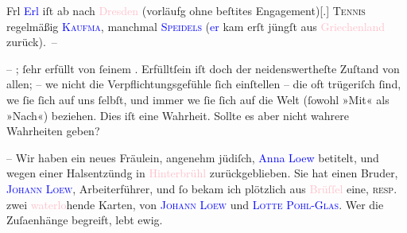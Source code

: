 \pstart
           Frl \textcolor{blue}{Erl}{}\ledrightnote{\textcolor{blue}{Dora Erl}} iſt ab nach \textcolor{pink}{Dresden}{}\ledrightnote{\textcolor{pink}{Dresden}} (vorläufg ohne beſti{\geminationm}tes
                  Engagement){[}.{]}{ }\textsc{Tennis} regelmäßig \textsc{\textcolor{blue}{Kaufma{\geminationn}}{}\ledrightnote{\textcolor{blue}{Arthur Kaufmann}}}, manchmal \textsc{\textcolor{blue}{Speidels}{}\ledrightnote{\textcolor{blue}{Felix Speidel}{\newline}\textcolor{blue}{Else Speidel-Haeberle}}} (\textcolor{blue}{er}{}\ledrightnote{{$\rightarrow$}\textcolor{blue}{Felix Speidel}} kam erſt jüngſt aus
                  \textcolor{pink}{Griechenland}{}\ledrightnote{\textcolor{pink}{Griechenland}} zurück). –\pend
           
\pstart
           – \label{K_L03005-15v}\label{K_L03005-15h}; ſehr erfüllt von ſeinem \label{K_L03005-16v}\label{K_L03005-16h}. Erfülltſein iſt doch der neidenswertheſte Zuſtand von allen; – we{\geminationn} nicht die Verpflichtungsgefühle ſich einſtellen – die
               oft trügeriſch ſind, we{\geminationn} ſie ſich auf uns ſelbſt, und
               immer we{\geminationn} ſie ſich auf die Welt (ſowohl »Mit« als
               »Nach«) {\pb}beziehen. Dies iſt eine Wahrheit.
               Sollte es aber nicht wahrere Wahrheiten geben?\pend
           
\pstart
           – Wir haben ein neues Fräulein, angenehm jüdiſch, \textcolor{blue}{Anna Loew}{}\ledrightnote{\textcolor{blue}{Anna Loew}} betitelt, und wegen einer Halsentzündg in \textcolor{pink}{Hinterbrühl}{}\ledrightnote{\textcolor{pink}{Hinterbrühl}} zurückgeblieben. Sie hat einen Bruder, \textsc{\textcolor{blue}{Johann Loew}{}\ledrightnote{\textcolor{blue}{Johann Loew}}}, Arbeiterführer, und ſo bekam ich plötzlich aus \textcolor{pink}{Brüſſel}{}\ledrightnote{\textcolor{pink}{Brüssel}} eine, \textsc{resp.} zwei \textcolor{pink}{waterlo}{}\ledrightnote{\textcolor{pink}{Waterloo}}hende Karten, von \textsc{\textcolor{blue}{Johann Loew}{}\ledrightnote{\textcolor{blue}{Johann Loew}}} und \textsc{\textcolor{blue}{Lotte Pohl-Glas}{}\ledrightnote{\textcolor{blue}{Charlotte Pohl-Glas}}}. Wer die Zuſa{\geminationm}enhänge begreift, lebt ewig.\pend
           
